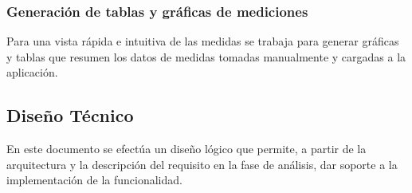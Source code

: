 \subsubsection{Generación de tablas y gráficas de mediciones}

Para una vista rápida e intuitiva de las medidas se trabaja para generar gráficas y tablas que resumen los datos de medidas tomadas manualmente y cargadas a la aplicación.

\subsection{Diseño Técnico}
En este documento se efectúa un diseño lógico que permite, a partir de la arquitectura y la descripción del requisito en la fase de análisis, dar soporte a la implementación de la funcionalidad.


